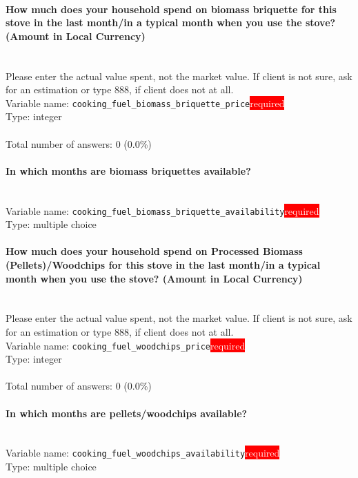 \documentclass[11.5pt, a4paper]{scrartcl}
\begin{document}
\paragraph{How much  does your household spend on biomass briquette for this stove in the last month/in a typical month when you use the stove? (Amount in Local Currency) }
\ \\ {\small Please enter the actual value spent, not the market value. If client is not sure, ask for an estimation or type 888, if client does not at all. }
\  \\Variable name: \texttt{cooking\_fuel\_biomass\_briquette\_price}\hfill\colorbox{red}{\small{\textcolor{white}{required}}}\\
 Type: integer\\
\\Total number of answers: 0 (0.0\%)
\\[0.2em]\paragraph{In which months are biomass briquettes available?}
\  \\Variable name: \texttt{cooking\_fuel\_biomass\_briquette\_availability}\hfill\colorbox{red}{\small{\textcolor{white}{required}}}\\
 Type: multiple choice\\
\paragraph{How much  does your household spend on Processed Biomass (Pellets)/Woodchips for this stove in the last month/in a typical month when you use the stove? (Amount in Local Currency) }
\ \\ {\small Please enter the actual value spent, not the market value. If client is not sure, ask for an estimation or type 888, if client does not at all. }
\  \\Variable name: \texttt{cooking\_fuel\_woodchips\_price}\hfill\colorbox{red}{\small{\textcolor{white}{required}}}\\
 Type: integer\\
\\Total number of answers: 0 (0.0\%)
\\[0.2em]\paragraph{In which months are pellets/woodchips available?}
\  \\Variable name: \texttt{cooking\_fuel\_woodchips\_availability}\hfill\colorbox{red}{\small{\textcolor{white}{required}}}\\
 Type: multiple choice\\
\end{document}
